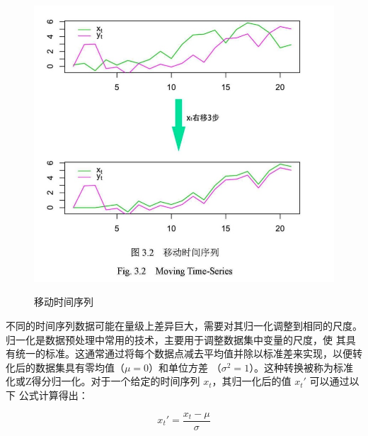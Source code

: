\begin{figure}[H]
    \centering
    \includegraphics[scale=0.3,angle=0]{figure/NCC.jpg}\\
    \caption{移动时间序列}
    \label{fig:NCC}
\end{figure}
不同的时间序列数据可能在量级上差异巨大，需要对其归一化调整到相同的尺度。归一化是数据预处理中常用的技术，主要用于调整数据集中变量的尺度，使
其具有统一的标准。这通常通过将每个数据点减去平均值并除以标准差来实现，以便转化后的数据集具有零均值（\( \mu = 0 \)）和单位方差
（\( \sigma^2 = 1 \)）。这种转换被称为标准化或Z得分归一化。对于一个给定的时间序列 \( x_t \)，其归一化后的值 \( x_t' \) 可以通过以下
公式计算得出：

\begin{equation}
x_t' = \frac{x_t - \mu}{\sigma}
\label{eq:normal1}
\end{equation}


